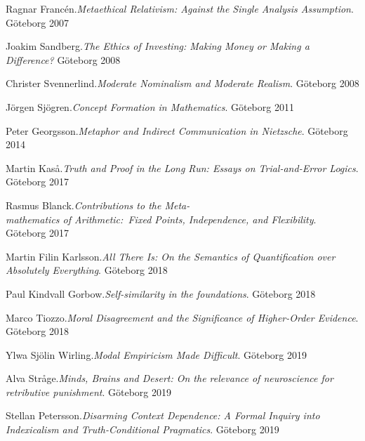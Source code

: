 \documentclass[fontsize=14pt,
               paper=297mm:210mm,
               twoside,
               pagesize=pdftex,
               DIV=calc
]{scrbook}
\begin{document}
\begin{multicols*}{2}
\begin{Volumes}
\pagebreak

\item Ragnar Franc\'{e}n.\enspace\textit{Metaethical Relativism: Against the Single Analysis Assumption}. \mbox{G\"oteborg} 2007

\item Joakim Sandberg.\enspace\textit{The Ethics of Investing: Making Money or Making a Difference?} \mbox{G\"oteborg} 2008

\item Christer Svennerlind.\enspace\textit{Moderate Nominalism and Moderate Realism}. \mbox{G\"oteborg} 2008

\item J\"orgen Sj\"ogren.\enspace\textit{Concept Formation in Mathematics}. \mbox{G\"oteborg} 2011

\item Peter Georgsson.\enspace\textit{Metaphor and Indirect Communication in Nietzsche}. \mbox{G\"oteborg} 2014

\item Martin Kas\aa{}.\enspace\textit{Truth and Proof in the Long Run: Essays on Trial-and-Error Logics}. \mbox{G\"oteborg} 2017

\item Rasmus Blanck.\enspace\textit{Contributions to the Meta-\\mathematics of Arithmetic:~Fixed Points, Independence, and Flexibility}. \mbox{G\"oteborg} 2017

\item Martin Filin Karlsson.\enspace\textit{All There Is: On the Semantics of Quantification over Absolutely Everything}. \mbox{G\"oteborg} 2018

\item Paul Kindvall Gorbow.\enspace\textit{Self-similarity in the foundations}. \mbox{G\"oteborg} 2018

\item Marco Tiozzo.\enspace\textit{Moral Disagreement and the Significance of Higher-Order Evidence}. \mbox{G\"oteborg} 2018

\item Ylwa Sj\"olin Wirling.\enspace\textit{Modal Empiricism Made Difficult}. \mbox{G\"oteborg} 2019

\item Alva Str\aa{}ge.\enspace\textit{Minds, Brains and Desert: On the relevance of neuroscience for retributive punishment}. \mbox{G\"oteborg} 2019

\item Stellan Petersson.\enspace\textit{Disarming Context Dependence: A Formal Inquiry into Indexicalism and Truth-Conditional Pragmatics}. \mbox{G\"oteborg} 2019


\end{Volumes}
\end{multicols*}
\end{document}
